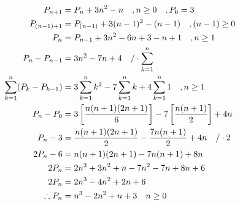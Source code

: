 \begin{align*}
    P_{n+1} &= P_n + 3n^{2}-n\quad ,n\ge0 \quad ,P_0=3\\
    P_{(n-1)+1} &= P_{(n-1)} + 3(n-1)^{2}-(n-1)\quad ,(n-1)\ge0\\
    P_{n} &= P_{n-1} + 3n^2 -6n +3 -n+1\quad ,n\ge1\\
    P_{n} - P_{n-1} &= 3n^2 -7n +4\quad \text{/}\cdot\sum\limits_{k=1}^{n}\\
    \sum\limits_{k=1}^{n}(P_{k} - P_{k-1}) &= 3\sum\limits_{k=1}^{n}k^2 -7\sum\limits_{k=1}^{n}k +4\sum\limits_{k=1}^{n}1 \quad ,n\ge1\\
    P_n - P_0 &= 3\left[\frac{n(n+1)(2n+1)}{6} \right] -7\left[\frac{n(n+1)}{2}\right] +4n \\
    P_n - 3 &= \frac{n(n+1)(2n+1)}{2} - \frac{7n(n+1)}{2} + 4n\quad \text{/}\cdot2 \\
    2P_n - 6 &= n(n+1)(2n+1) - 7n(n+1) + 8n \\
    2P_n &= 2n^3 +3n^2 +n - 7n^2 -7n + 8n +6\\
    2P_n &= 2n^3 -4n^2 +2n +6\\
    \therefore P_n &= n^3 -2n^2 +n +3 \quad n \ge 0
\end{align*}